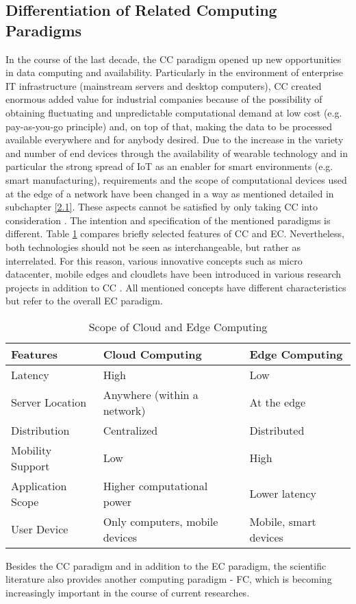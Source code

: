 \subsection{Differentiation of Related Computing Paradigms}
In the course of the last decade, the CC paradigm opened up new opportunities in data computing and availability. Particularly in the environment of enterprise IT infrastructure (mainstream servers and desktop computers), CC created enormous added value for industrial companies because of the possibility of obtaining fluctuating and unpredictable computational demand at low cost (e.g. pay-as-you-go principle) and, on top of that, making the data to be processed available everywhere and for anybody desired.
Due to the increase in the variety and number of end devices through the availability of wearable technology and in particular the strong spread of IoT as an enabler for smart environments (e.g. smart manufacturing), requirements and the scope of computational devices used at the edge of a network have been changed in a way as mentioned detailed in subchapter \ref{2.1}. These aspects cannot be satisfied by only taking CC into consideration \cite{baktir2017can}.
The intention and specification of the mentioned paradigms is different. Table \ref{table:1} compares briefly selected features of CC and EC. Nevertheless, both technologies should not be seen as interchangeable, but rather as interrelated.
For this reason, various innovative concepts such as micro datacenter, mobile edges and cloudlets have been introduced in various research projects in addition to CC \cite{7488250}.
All mentioned concepts have different characteristics but refer to the overall EC paradigm.

\begin{table}[h!] 
\centering
\begin{tabular}{ |p{2.7cm}|p{4.6cm}|p{4.4cm}|  }
 \hline
 Features & Cloud Computing & Edge Computing \\ [0.5ex] 
 \hline\hline
Latency & High & Low \\
Server Location & Anywhere (within a network) & At the edge \\
Distribution & Centralized & Distributed \\
Mobility Support & Low & High \\
Application Scope & Higher computational power & Lower latency \\
User Device & Only computers, mobile devices & Mobile, smart devices \\
 \hline
\end{tabular}
\caption{Scope of Cloud and Edge Computing \cite{baktir2017can}}
\label{table:1}
\end{table}
Besides the CC paradigm and in addition to the EC paradigm, the scientific literature also provides another computing paradigm - FC, which is becoming increasingly important in the course of current researches.

